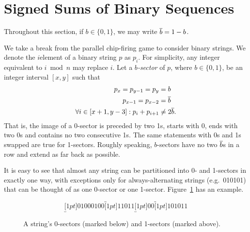 \section{Signed Sums of Binary Sequences}\label{binSeq}
Throughout this section, if $b \in \{0,1\}$, we may write $\overline{b} = 1-b$.

We take a break from the parallel chip-firing game to consider binary
strings. We denote the $i$\xth element of a binary string $p$ as $p_i$. For
simplicity, any integer equivalent to $i \bmod n$ may replace $i$. Let a
\emph{$b$-sector} of $p$, where $b \in \{0,1\}$, be an integer interval $[x,y]$
such that
\begin{align*}
  p_x = p_{y-1} = p_y &= b \\
  p_{x-1} = p_{x-2} &= \overline{b} \\
  \forall i \in [x+1, y-3]: p_i + p_{i+1} &\neq 2\overline{b}.
\end{align*}
That is, the image of a 0-sector is preceded by two 1s, starts with 0, ends
with two 0s and contains no two consecutive 1s. The same statements with 0s and
1s swapped are true for 1-sectors. Roughly speaking, $b$-sectors have no two
$\overline{b}$s in a row and extend as far back as possible.

It is easy to see that almost any string can be partitioned into 0- and
1-sectors in exactly one way, with exceptions only for always-alternating
strings (e.g.\ 010101) that can be thought of as one 0-sector or one
1-sector. Figure~\ref{sectorEx} has an example.

\begin{figure}
  \[
    \underbracket[1pt]{01000100}\overbracket[1pt]{11011}\underbracket[1pt]{00}
    \overbracket[1pt]{101011}
  \]
  \caption{A string's 0-sectors (marked below) and 1-sectors (marked
    above).}
  \label{sectorEx}
\end{figure}

